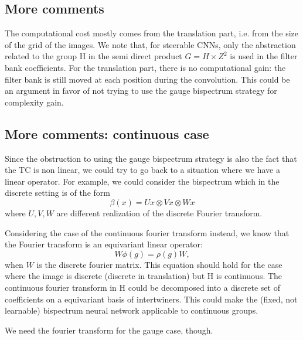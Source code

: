 \documentclass{article}
\begin{document}
\subsection{More comments}

The computational cost mostly comes from the translation part, i.e. from the size of the grid of the images. We note that, for steerable CNNs, only the abstraction related to the group H in the semi direct product $G = H \times Z^2$ is used in the filter bank coefficients. For the translation part, there is no computational gain: the filter bank is still moved at each position during the convolution. This could be an argument in favor of not trying to use the gauge bispectrum strategy for complexity gain.

\subsection{More comments: continuous case}

Since the obstruction to using the gauge bispectrum strategy is also the fact that the TC is non linear, we could try to go back to a situation where we have a linear operator. For example, we could consider the bispectrum which in the discrete setting is of the form
\begin{equation}
    \beta(x) = Ux \otimes Vx \otimes Wx
\end{equation}
where $U, V, W$ are different realization of the discrete Fourier transform.

Considering the case of the continuous fourier transform instead, we know that the Fourier transform is an equivariant linear operator:
\begin{equation}
    W\phi(g) = \rho(g) W,
\end{equation}
when $W$ is the discrete fourier matrix. This equation should hold for the case where the image is discrete (discrete in translation) but H is continuous. The continuous fourier transform in H could be decomposed into a discrete set of coefficients on a equivariant basis of intertwiners. This could make the (fixed, not learnable) bispectrum neural network applicable to continuous groups.

We need the fourier transform for the gauge case, though.




\end{document}
